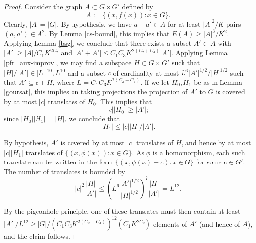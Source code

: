 \begin{proof}\leanok Consider the graph $A \subset G \times G'$ defined by
$$ A := \{ (x,f(x)): x \in G \}.$$
Clearly, $|A| = |G|$.  By hypothesis, we have $a+a' \in A$ for at least
$|A|^2/K$ pairs $(a,a') \in A^2$. By Lemma \ref{cs-bound}, this implies that
$E(A) \geq |A|^3/K^2$.  Applying Lemma \ref{bsg}, we conclude that there
exists a subset $A' \subset A$ with $|A'| \geq |A|/C_1 K^{2C_2}$ and $|A'+A'|
\leq C_1C_3 K^{2(C_2+C_4)} |A'|$. Applying Lemma \ref{pfr_aux-improv}, we may
find a subspace $H \subset G \times G'$ such that $|H| / |A'| \in [L^{-10},
L^{10}$ and a subset $c$ of cardinality at most $L^6 |A'|^{1/2} / |H|^{1/2}$
such that $A' \subseteq c + H$, where $L =  C_1C_3 K^{2(C_2+C_4)}$. If we let
$H_0,H_1$ be as in Lemma \ref{goursat}, this implies on taking projections
the projection of $A'$ to $G$ is covered by at most $|c|$ translates of
$H_0$.  This implies that
$$ |c| |H_0| \geq |A'|;$$
since $|H_0| |H_1| = |H|$, we conclude that
$$ |H_1| \leq |c| |H|/|A'|.$$

By hypothesis, $A'$ is covered by at most $|c|$ translates of $H$, and hence
by at most $|c| |H_1|$ translates of $\{ (x,\phi(x)): x \in G \}$.  As $\phi$
is a homomorphism, each such translate can be written in the form $\{
(x,\phi(x)+c): x \in G \}$ for some $c \in G'$. The number of translates is
bounded by
$$
|c|^2 \frac{|H|}{|A'|} \leq \left(L^6 \frac{|A'|^{1/2}}{|H|^{1/2}}\right)^2 \frac{|H|}{|A'|} = L^{12}.
$$

By the pigeonhole principle, one of these translates must then contain at
least $|A'|/L^{12} \geq |G| / (C_1C_3 K^{2(C_2+C_4)})^{12} (C_1 K^{2C_2})$
elements of $A'$ (and hence of $A$), and the claim follows.
\end{proof}
